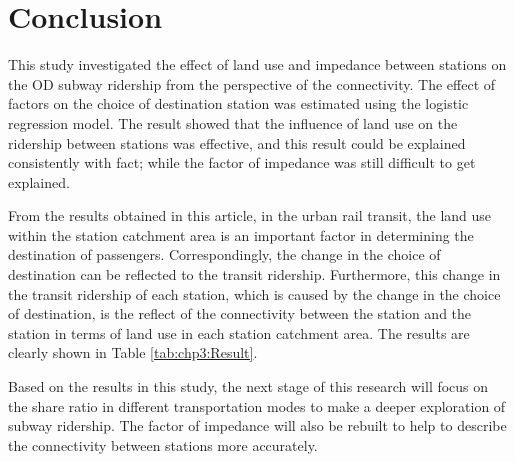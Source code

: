 %
\section{Conclusion}
%
This study investigated the effect of land use and impedance between stations on the OD subway ridership from the perspective of the connectivity. The effect of factors on the choice of destination station was estimated using the logistic regression model. The result showed that the influence of land use on the ridership between stations was effective, and this result could be explained consistently with fact; while the factor of impedance was still difficult to get explained.

%
From the results obtained in this article, in the urban rail transit, the land use within the station catchment area is an important factor in determining the destination of passengers. Correspondingly, the change in the choice of destination can be reflected to the transit ridership. Furthermore, this change in the transit ridership of each station, which is caused by the change in the choice of destination, is the reflect of the connectivity between the station and the station in terms of land use in each station catchment area. The results are clearly shown in Table \ref{tab:chp3:Result}.

%
Based on the results in this study, the next stage of this research will focus on the share ratio in different transportation modes to make a deeper exploration of subway ridership. The factor of impedance will also be rebuilt to help to describe the connectivity between stations more accurately.

\clearpage %
% 

